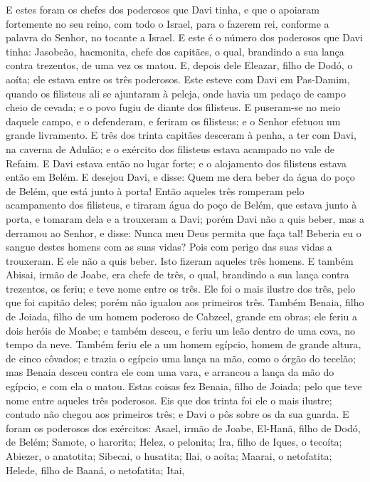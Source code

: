 E estes foram os chefes dos poderosos que Davi tinha, e que o
apoiaram fortemente no seu reino, com todo o Israel, para o fazerem
rei, conforme a palavra do Senhor, no tocante a Israel. E
este é o número dos poderosos que Davi tinha: Jasobeão, hacmonita,
chefe dos capitães, o qual, brandindo a sua lança contra trezentos,
de uma vez os matou. E, depois dele Eleazar, filho de Dodó, o
aoíta; ele estava entre os três poderosos. Este esteve com
Davi em Pas-Damim, quando os filisteus ali se ajuntaram à peleja,
onde havia um pedaço de campo cheio de cevada; e o povo fugiu de
diante dos filisteus. E puseram-se no meio daquele campo, e o
defenderam, e feriram os filisteus; e o Senhor efetuou um grande
livramento. E três dos trinta capitães desceram à penha, a
ter com Davi, na caverna de Adulão; e o exército dos filisteus
estava acampado no vale de Refaim. E Davi estava então no
lugar forte; e o alojamento dos filisteus estava então em Belém.
E desejou Davi, e disse: Quem me dera beber da água do poço
de Belém, que está junto à porta! Então aqueles três romperam
pelo acampamento dos filisteus, e tiraram água do poço de Belém, que
estava junto à porta, e tomaram dela e a trouxeram a Davi; porém
Davi não a quis beber, mas a derramou ao Senhor, e disse:
Nunca meu Deus permita que faça tal! Beberia eu o sangue destes
homens com as suas vidas? Pois com perigo das suas vidas a
trouxeram. E ele não a quis beber. Isto fizeram aqueles três homens.
E também Abisai, irmão de Joabe, era chefe de três, o qual,
brandindo a sua lança contra trezentos, os feriu; e teve nome entre
os três. Ele foi o mais ilustre dos três, pelo que foi
capitão deles; porém não igualou aos primeiros três. Também
Benaia, filho de Joiada, filho de um homem poderoso de Cabzeel,
grande em obras; ele feriu a dois heróis de Moabe; e também desceu,
e feriu um leão dentro de uma cova, no tempo da neve. Também
feriu ele a um homem egípcio, homem de grande altura, de cinco
côvados; e trazia o egípcio uma lança na mão, como o órgão do
tecelão; mas Benaia desceu contra ele com uma vara, e arrancou a
lança da mão do egípcio, e com ela o matou. Estas coisas fez
Benaia, filho de Joiada; pelo que teve nome entre aqueles três
poderosos. Eis que dos trinta foi ele o mais ilustre; contudo
não chegou aos primeiros três; e Davi o pôs sobre os da sua guarda.
E foram os poderosos dos exércitos: Asael, irmão de Joabe,
El-Hanã, filho de Dodó, de Belém; Samote, o harorita; Helez,
o pelonita; Ira, filho de Iques, o tecoíta; Abiezer, o
anatotita; Sibecai, o husatita; Ilai, o aoíta; Maarai,
o netofatita; Helede, filho de Baaná, o netofatita; Itai,
